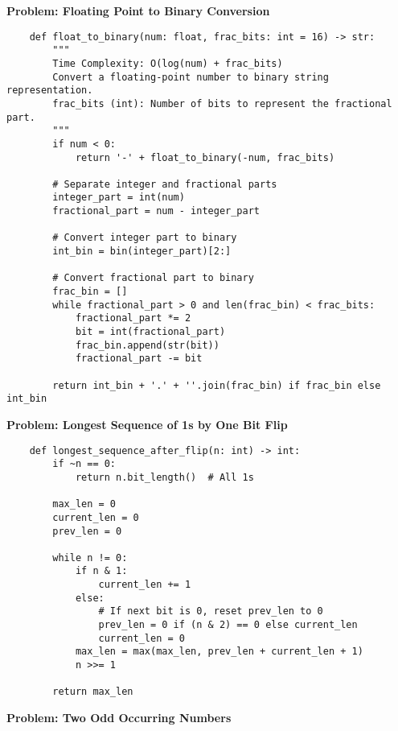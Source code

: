     \noindent\textbf{Problem: Floating Point to Binary Conversion}
    \begin{verbatim}
    def float_to_binary(num: float, frac_bits: int = 16) -> str:
        """
        Time Complexity: O(log(num) + frac_bits)
        Convert a floating-point number to binary string representation.
        frac_bits (int): Number of bits to represent the fractional part.
        """
        if num < 0:
            return '-' + float_to_binary(-num, frac_bits)

        # Separate integer and fractional parts
        integer_part = int(num)
        fractional_part = num - integer_part

        # Convert integer part to binary
        int_bin = bin(integer_part)[2:]

        # Convert fractional part to binary
        frac_bin = []
        while fractional_part > 0 and len(frac_bin) < frac_bits:
            fractional_part *= 2
            bit = int(fractional_part)
            frac_bin.append(str(bit))
            fractional_part -= bit  

        return int_bin + '.' + ''.join(frac_bin) if frac_bin else int_bin

    \end{verbatim}
    \noindent\textbf{Problem: Longest Sequence of 1s by One Bit Flip}
    \begin{verbatim}
    def longest_sequence_after_flip(n: int) -> int:
        if ~n == 0:
            return n.bit_length()  # All 1s

        max_len = 0
        current_len = 0
        prev_len = 0

        while n != 0:
            if n & 1:
                current_len += 1
            else:
                # If next bit is 0, reset prev_len to 0
                prev_len = 0 if (n & 2) == 0 else current_len
                current_len = 0
            max_len = max(max_len, prev_len + current_len + 1)
            n >>= 1

        return max_len

    \end{verbatim}
    \noindent\textbf{Problem: Two Odd Occurring Numbers}
